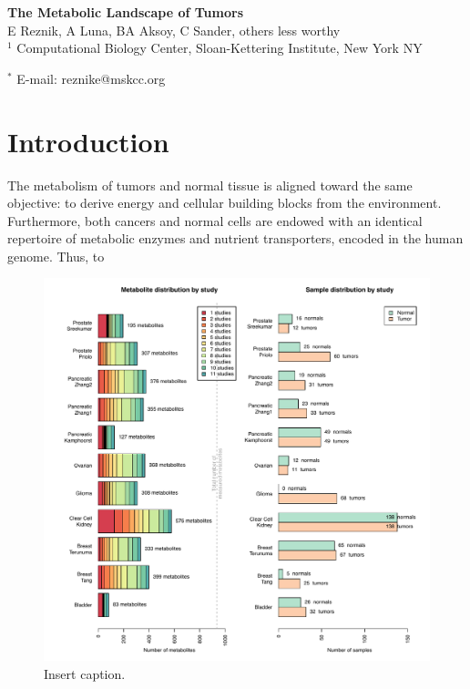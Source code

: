 \documentclass[10pt]{article}
\date{}
\begin{document}
\begin{flushleft}
{\Large
\textbf{The Metabolic Landscape of Tumors}
}
\\
E Reznik, A Luna, BA Aksoy, C Sander, others less worthy
\\
$^1$ Computational Biology Center, Sloan-Kettering Institute, New York NY

$^\ast$ E-mail: reznike@mskcc.org
\end{flushleft}

\begin{abstract}
\end{abstract}

\section{Introduction}

The metabolism of tumors and normal tissue is aligned toward the same objective: to derive energy and cellular building blocks from the environment. Furthermore, both cancers and normal cells are endowed with an identical repertoire of metabolic enzymes and nutrient transporters, encoded in the human genome. Thus, to 


\begin{figure}[ht!]
  \centering
     \includegraphics[scale = 0.5]{figures/Figure1/Figure1.pdf}
  \caption{Insert caption. }
     \label{fig:Fig1}
\end{figure}
\end{document}
